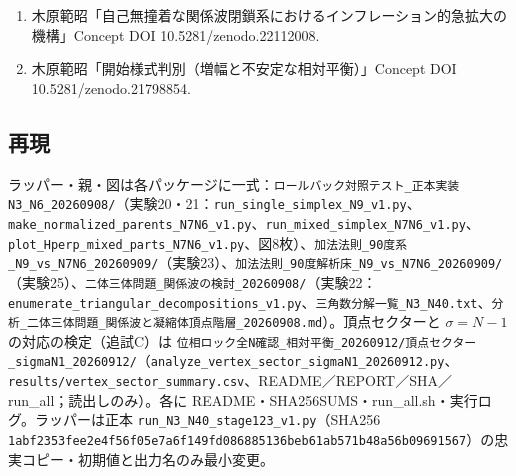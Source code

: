 \documentclass[
  a4paper,
]{ltjsarticle}
\providecommand{\tightlist}{%
  \setlength{\itemsep}{0pt}\setlength{\parskip}{0pt}}
\begin{document}
\begin{enumerate}
\def\labelenumi{\arabic{enumi}.}
\tightlist
\item
  木原範昭「自己無撞着な関係波閉鎖系におけるインフレーション的急拡大の機構」Concept
  DOI 10.5281/zenodo.22112008.
\item
  木原範昭「開始様式判別（増幅と不安定な相対平衡）」Concept DOI
  10.5281/zenodo.21798854.
\end{enumerate}

\subsection{再現}\label{ux518dux73fe}

ラッパー・親・図は各パッケージに一式：\texttt{ロールバック対照テスト\_正本実装N3\_N6\_20260908/}（実験20・21：\texttt{run\_single\_simplex\_N9\_v1.py}、\texttt{make\_normalized\_parents\_N7N6\_v1.py}、\texttt{run\_mixed\_simplex\_N7N6\_v1.py}、\texttt{plot\_Hperp\_mixed\_parts\_N7N6\_v1.py}、図8枚）、\texttt{加法法則\_90度系\_N9\_vs\_N7N6\_20260909/}（実験23）、\texttt{加法法則\_90度解析床\_N9\_vs\_N7N6\_20260909/}（実験25）、\texttt{二体三体問題\_関係波の検討\_20260908/}（実験22：\texttt{enumerate\_triangular\_decompositions\_v1.py}、\texttt{三角数分解一覧\_N3\_N40.txt}、\texttt{分析\_二体三体問題\_関係波と凝縮体頂点階層\_20260908.md}）。頂点セクターと
\(\sigma=N-1\) の対応の検定（追試C）は
\texttt{位相ロック全N確認\_相対平衡\_20260912/頂点セクター\_sigmaN1\_20260912/}（\texttt{analyze\_vertex\_sector\_sigmaN1\_20260912.py}、\texttt{results/vertex\_sector\_summary.csv}、README／REPORT／SHA／run\_all；読出しのみ）。各に
README・SHA256SUMS・run\_all.sh・実行ログ。ラッパーは正本
\texttt{run\_N3\_N40\_stage123\_v1.py}（SHA256
\texttt{1abf2353fee2e4f56f05e7a6f149fd086885136beb61ab571b48a56b09691567}）の忠実コピー・初期値と出力名のみ最小変更。
\end{document}
